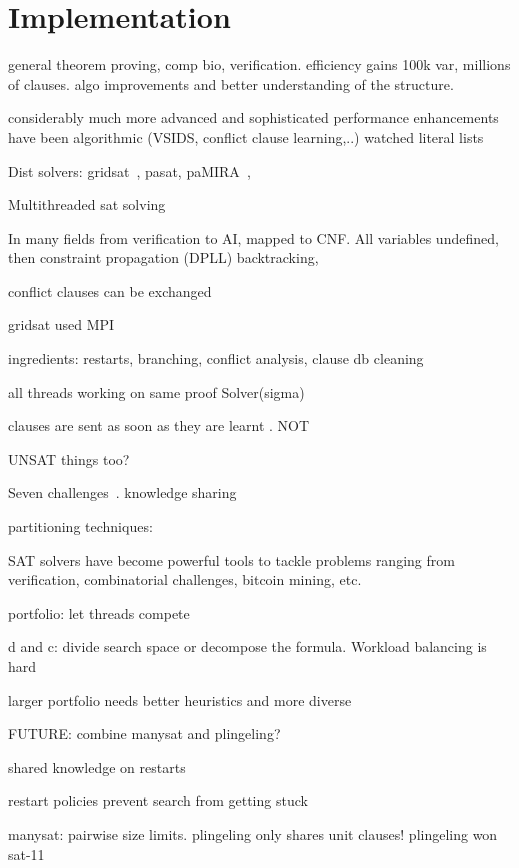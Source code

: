 \documentclass{article}
\begin{document}
\section{Implementation}



general theorem proving, comp bio, verification. efficiency gains 100k var, millions of clauses. algo improvements and better understanding of the structure. 



considerably much more advanced and sophisticated
performance enhancements have been algorithmic (VSIDS, conflict clause learning,..) 
watched literal lists 

Dist solvers: gridsat~\cite{chrabakh2003gridsat}, pasat, paMIRA~\cite{schubert2005pamira}, 

Multithreaded sat solving~\cite{lewis2007multithreaded}

In many fields from verification to AI, mapped to CNF. All variables
undefined, then constraint propagation (DPLL) backtracking,

conflict clauses can be exchanged

gridsat used MPI 

ingredients: restarts, branching, conflict analysis, clause db cleaning

all threads working on same proof Solver(sigma) 

clauses are sent as soon as they are learnt . NOT 

UNSAT things too? 

Seven challenges~\cite{hamadi2013seven}. knowledge sharing

partitioning techniques: ~\cite{hyvarinen2010partitioning}

SAT solvers have become powerful tools to tackle problems ranging from
verification, combinatorial challenges, bitcoin mining, etc.

portfolio: let threads compete 

d and c: divide search space or decompose the formula. Workload balancing is hard 

larger portfolio needs better heuristics and more diverse 

FUTURE: combine manysat and plingeling?

shared knowledge on restarts 

restart policies prevent search from getting stuck 

manysat: pairwise size limits. plingeling only shares unit clauses! plingeling won sat-11
\end{document}
